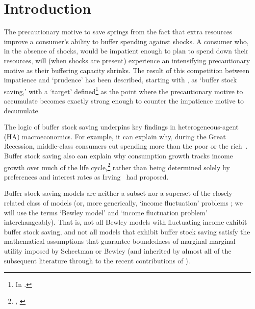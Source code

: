 \documentclass[BufferStockTheory]{subfiles}
\begin{document}
  \medskip\medskip
  \begin{minipage}{0.9\textwidth}
    \listoftables
  \end{minipage}

\hypersetup{pageanchor=true}  %

\pagebreak
\hypertarget{Introduction}{}
\section{Introduction}\label{sec:intro}
\setcounter{page}{0}

The precautionary motive to save springs from the fact that extra resources improve a consumer's ability to buffer spending against shocks.
A consumer who, in the absence of shocks, would be impatient enough to plan to spend down their resources, will (when shocks are present) experience an intensifying precautionary motive as their buffering capacity shrinks.
The result of this competition between impatience and `prudence' \citep{kimball:smallandlarge} has been described, starting with \cite{deatonLiqConstr}, as `buffer stock saving,' with a `target' defined\footnote{In \cite{carroll:brookings}.} as the point where the precautionary motive to accumulate becomes exactly strong enough to counter the impatience motive to decumulate.

The logic of buffer stock saving underpins key findings in heterogeneous-agent (HA) macroeconomics.
For example, it can explain why, during the Great Recession, middle-class consumers cut spending more than the poor or the rich~\citep{kmpHandbook}.
Buffer stock saving also can explain why consumption growth tracks income growth over much of the life cycle,\footnote{\cite{carrollBSLCPIH}, \cite{gpLifeCycle}} rather than being determined solely by preferences and interest rates as Irving~\cite{fisherInterestTheory} had proposed.

Buffer stock saving models are neither a subset nor a superset of the closely-related class of \cite{bewleyPIH} models (or, more generically, `income fluctuation' problems  \citep{schectman:fluctuation}; we will use the terms `Bewley model' and `income fluctuation problem' interchangeably).
That is, not all Bewley models with fluctuating income exhibit buffer stock saving, and not all models that exhibit buffer stock saving satisfy the mathematical assumptions that guarantee boundedness of marginal marginal utility imposed by Schectman or Bewley (and inherited by almost all of the subsequent literature through to the recent contributions of \cite{mstIncFluct,maUnboundedDP}). 
\end{document}

